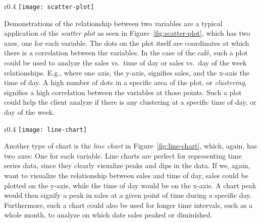 \pagebreak

\begin{wrapfigure}{r}{0.4\textwidth}
    \centering
    \texttt{[image: scatter-plot]}
    \caption{A typical scatter plot~\cite{atlassianChartTypes}.}\label{fig:scatter-plot}
\end{wrapfigure}
Demonstrations of the relationship between two variables are a typical application of the \textit{scatter plot}
as seen in Figure~\ref{fig:scatter-plot}, which has two axes, one for each variable.
The dots on the plot itself are coordinates at which there is a correlation between the variables.
In the case of the café, such a plot could be used to analyze the sales vs.\ time of day or sales vs.\ day of the week
relationships.
E.g., where one axis, the y-axis, signifies sales, and the x-axis the time of day.
A high number of dots in a specific area of the plot, or \textit{clustering}, signifies a high correlation between the
variables at those points.
Such a plot could help the client analyze if there is any clustering at a specific time of day, or day of the week.

\begin{wrapfigure}{r}{0.4\textwidth}
    \centering
    \texttt{[image: line-chart]}
    \caption{A line chart~\cite{atlassianChartTypes}.}\label{fig:line-chart}
\end{wrapfigure}
Another type of chart is the \textit{line chart} in Figure~\ref{fig:line-chart}, which, again, has two axes: One for
each variable.
Line charts are perfect for representing time series data, since they clearly visualize peaks and dips in the data.
If we, again, want to visualize the relationship between sales and time of day, sales could be plotted on the y-axis,
while the time of day would be on the x-axis.
A chart peak would then signify a peak in sales at a given point of time during a specific day.
Furthermore, such a chart could also be used for longer time intervals, such as a whole month, to analyze on which date
sales peaked or diminished.


